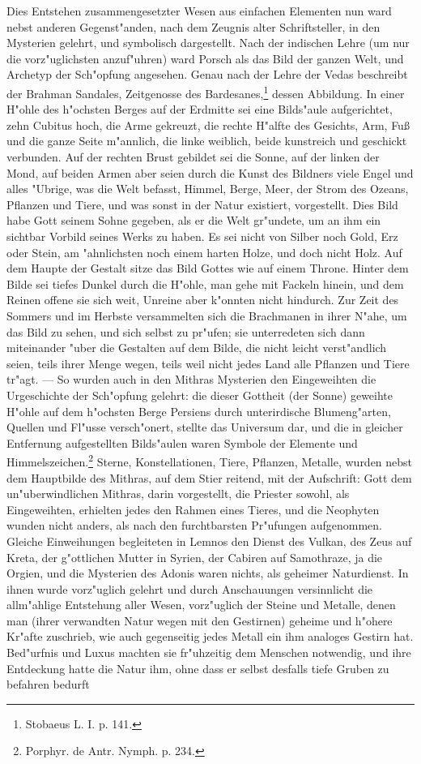 \documentclass[a4paper, 11pt, oneside, polutonikogreek, german]{article}
\begin{document}
Dies Entstehen zusammengesetzter Wesen aus einfachen Elementen nun ward nebst anderen Gegenst"anden, nach dem Zeugnis alter Schriftsteller, in den Mysterien gelehrt, und symbolisch dargestellt. Nach der indischen Lehre (um nur die vorz"uglichsten anzuf"uhren) ward Porsch als das Bild der ganzen Welt, und Archetyp der Sch"opfung angesehen. Genau nach der Lehre der Vedas beschreibt der Brahman Sandales, Zeitgenosse des Bardesanes,\footnote{Stobaeus L. I. p. 141.} dessen Abbildung. In einer H"ohle des h"ochsten Berges auf der Erdmitte sei eine Bilds"aule aufgerichtet, zehn Cubitus hoch, die Arme gekreuzt, die rechte H"alfte des Gesichts, Arm, Fuß und die ganze Seite m"annlich, die linke weiblich, beide kunstreich und geschickt verbunden. Auf der rechten Brust gebildet sei die Sonne, auf der linken der Mond, auf beiden Armen aber seien durch die Kunst des Bildners viele Engel und alles "Ubrige, was die Welt befasst, Himmel, Berge, Meer, der Strom des Ozeans, Pflanzen und Tiere, und was sonst in der Natur existiert, vorgestellt. Dies Bild habe Gott seinem Sohne gegeben, als er die Welt gr"undete, um an ihm ein sichtbar Vorbild seines Werks zu haben. Es sei nicht von Silber noch Gold, Erz oder Stein, am "ahnlichsten noch einem harten Holze, und doch nicht Holz. Auf dem Haupte der Gestalt sitze das Bild Gottes wie auf einem Throne. Hinter dem Bilde sei tiefes Dunkel durch die H"ohle, man gehe mit Fackeln hinein, und dem Reinen offene sie sich weit, Unreine aber k"onnten nicht hindurch. Zur Zeit des Sommers und im Herbste versammelten sich die Brachmanen in ihrer N"ahe, um das Bild zu sehen, und sich selbst zu pr"ufen; sie unterredeten sich dann miteinander "uber die Gestalten auf dem Bilde, die nicht leicht verst"andlich seien, teils ihrer Menge wegen, teils weil nicht jedes Land alle Pflanzen und Tiere tr"agt. --- So wurden auch in den Mithras Mysterien den Eingeweihten die Urgeschichte der Sch"opfung gelehrt: die dieser Gottheit (der Sonne) geweihte H"ohle auf dem h"ochsten Berge Persiens durch unterirdische Blumeng"arten, Quellen und Fl"usse versch"onert, stellte das Universum dar, und die in gleicher Entfernung aufgestellten Bilds"aulen waren Symbole der Elemente und Himmelszeichen.\footnote{Porphyr. de Antr. Nymph. p. 234.} Sterne, Konstellationen, Tiere, Pflanzen, Metalle, wurden nebst dem Hauptbilde des Mithras, auf dem Stier reitend, mit der Aufschrift: Gott dem un"uberwindlichen Mithras, darin vorgestellt, die Priester sowohl, als Eingeweihten, erhielten jedes den Rahmen eines Tieres, und die Neophyten wunden nicht anders, als nach den furchtbarsten Pr"ufungen aufgenommen. Gleiche Einweihungen begleiteten in Lemnos den Dienst des Vulkan, des Zeus auf Kreta, der g"ottlichen Mutter in Syrien, der Cabiren auf Samothraze, ja die Orgien, und die Mysterien des Adonis waren nichts, als geheimer Naturdienst. In ihnen wurde vorz"uglich gelehrt und durch Anschauungen versinnlicht die allm"ahlige Entstehung aller Wesen, vorz"uglich der Steine und Metalle, denen man (ihrer verwandten Natur wegen mit den Gestirnen) geheime und h"ohere Kr"afte zuschrieb, wie auch gegenseitig jedes Metall ein ihm analoges Gestirn hat. Bed"urfnis und Luxus machten sie fr"uhzeitig dem Menschen notwendig, und ihre Entdeckung hatte die Natur ihm, ohne dass er selbst desfalls tiefe Gruben zu befahren bedurft 
\end{document}

